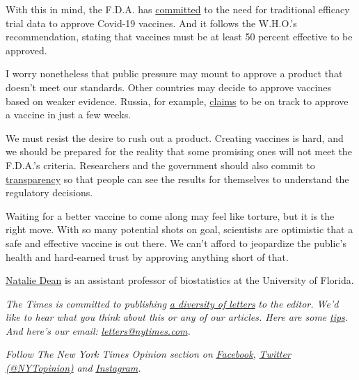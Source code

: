 With this in mind, the F.D.A. has
\href{https://www.fda.gov/regulatory-information/search-fda-guidance-documents/development-and-licensure-vaccines-prevent-covid-19}{committed}
to the need for traditional efficacy trial data to approve Covid-19
vaccines. And it follows the W.H.O.'s recommendation, stating that
vaccines must be at least 50 percent effective to be approved.

I worry nonetheless that public pressure may mount to approve a product
that doesn't meet our standards. Other countries may decide to approve
vaccines based on weaker evidence. Russia, for example,
\href{https://www.wsj.com/articles/russia-seeks-to-register-first-coronavirus-vaccine-in-august-11596047326}{claims}
to be on track to approve a vaccine in just a few weeks.

We must resist the desire to rush out a product. Creating vaccines is
hard, and we should be prepared for the reality that some promising ones
will not meet the F.D.A.'s criteria. Researchers and the government
should also commit to
\href{https://www.thenation.com/article/society/vaccine-coronavirus-october-surprise/}{transparency}
so that people can see the results for themselves to understand the
regulatory decisions.

Waiting for a better vaccine to come along may feel like torture, but it
is the right move. With so many potential shots on goal, scientists are
optimistic that a safe and effective vaccine is out there. We can't
afford to jeopardize the public's health and hard-earned trust by
approving anything short of that.

\href{https://www.nataliexdean.com/}{Natalie Dean} is an assistant
professor of biostatistics at the University of Florida.

\emph{The Times is committed to publishing}
\href{https://www.nytimes.com/2019/01/31/opinion/letters/letters-to-editor-new-york-times-women.html}{\emph{a
diversity of letters}} \emph{to the editor. We'd like to hear what you
think about this or any of our articles. Here are some}
\href{https://help.nytimes.com/hc/en-us/articles/115014925288-How-to-submit-a-letter-to-the-editor}{\emph{tips}}\emph{.
And here's our email:}
\href{mailto:letters@nytimes.com}{\emph{letters@nytimes.com}}\emph{.}

\emph{Follow The New York Times Opinion section on}
\href{https://www.facebook.com/nytopinion}{\emph{Facebook}}\emph{,}
\href{http://twitter.com/NYTOpinion}{\emph{Twitter (@NYTopinion)}}
\emph{and}
\href{https://www.instagram.com/nytopinion/}{\emph{Instagram}}\emph{.}

